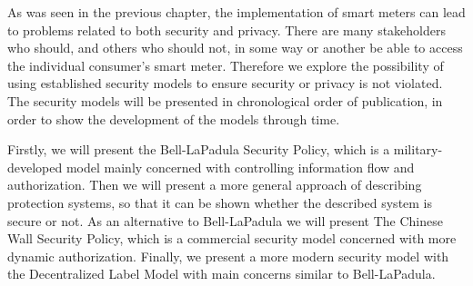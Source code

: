 
As was seen in the previous chapter, the implementation of smart meters can lead to problems related to both security and privacy.
There are many stakeholders who should, and others who should not, in some way or another be able to access the individual consumer's smart meter.
Therefore we explore the possibility of using established security models to ensure security or privacy is not violated.
The security models will be presented in chronological order of publication, in order to show the development of the models through time.

Firstly, we will present the Bell-LaPadula Security Policy, which is a military-developed model mainly concerned with controlling information flow and authorization.
Then we will present a more general approach of describing protection systems, so that it can be shown whether the described system is secure or not.
As an alternative to Bell-LaPadula we will present The Chinese Wall Security Policy, which is a commercial security model concerned with more dynamic authorization.
Finally, we present a more modern security model with the Decentralized Label Model with main concerns similar to Bell-LaPadula.
